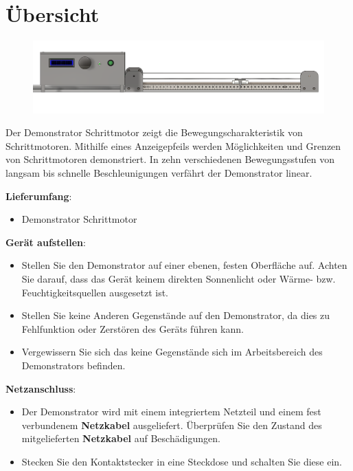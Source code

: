 %
%
%



\chapter{Übersicht}

\begin{figure}[htb]
	\begin{center}
		
			\includegraphics[width=\textwidth]{Images/Konstruktion1.png}
	\end{center}
\end{figure}


Der Demonstrator Schrittmotor zeigt die Bewegungscharakteristik von Schrittmotoren. Mithilfe eines Anzeigepfeils werden Möglichkeiten und Grenzen von Schrittmotoren demonstriert. In zehn verschiedenen Bewegungsstufen von langsam bis schnelle Beschleunigungen verfährt der Demonstrator linear. 

\newpage
\textbf{Lieferumfang}: 
\begin{itemize}
\item Demonstrator Schrittmotor	
	\end{itemize} 	
	\bigskip
	\textbf{Gerät aufstellen}: 
	\begin{itemize}
	\item Stellen Sie den Demonstrator auf einer ebenen, festen Oberfläche auf. Achten Sie darauf, dass das Gerät keinem direkten Sonnenlicht oder Wärme- bzw. Feuchtigkeitsquellen ausgesetzt ist. 
	\item Stellen Sie keine Anderen Gegenstände auf den Demonstrator, da dies zu Fehlfunktion oder Zerstören des Geräts führen kann. 
	\item Vergewissern Sie sich das keine Gegenstände sich im Arbeitsbereich des Demonstrators befinden.
	\end{itemize}
	\textbf{Netzanschluss}:
	\begin{itemize}
		\item Der Demonstrator wird mit einem integriertem Netzteil und einem fest verbundenem \textbf{Netzkabel} ausgeliefert. Überprüfen Sie den Zustand des mitgelieferten \textbf{Netzkabel} auf Beschädigungen.
		\item Stecken Sie den Kontaktstecker in eine Steckdose und schalten Sie diese ein. 
	\end{itemize} 



